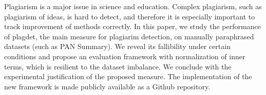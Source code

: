 Plagiarism is a major issue in science and education. Complex plagiarism, such as plagiarism of ideas, is hard to detect, and therefore it is especially important to track improvement of methods correctly. In this paper, we study the performance of plagdet, the main measure for plagiarim detection, on manually paraphrased datasets (such as PAN Summary). We reveal its fallibility under certain conditions and propose an evaluation framework with normalization of inner terms, which is resilient to the dataset imbalance. We conclude with the experimental justification of the proposed measure. The implementation of the new framework is made publicly available as a Github repository.
